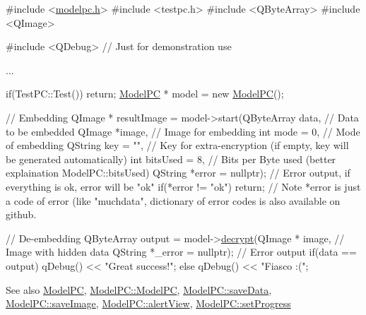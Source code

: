 \begin{DoxyCode}
\textcolor{preprocessor}{#include <\hyperlink{modelpc_8h}{modelpc.h}>}
\textcolor{preprocessor}{#include <testpc.h>}
\textcolor{preprocessor}{#include <QByteArray>}
\textcolor{preprocessor}{#include <QImage>}

\textcolor{preprocessor}{#include <QDebug>} \textcolor{comment}{// Just for demonstration use}

...

if(TestPC::Test())
    \textcolor{keywordflow}{return};
\hyperlink{class_model_p_c}{ModelPC} * model = \textcolor{keyword}{new} \hyperlink{class_model_p_c}{ModelPC}();

\textcolor{comment}{// Embedding}
QImage * resultImage = model->start(QByteArray data, \textcolor{comment}{// Data to be embedded}
                                    QImage *image, \textcolor{comment}{// Image for embedding}
                                    \textcolor{keywordtype}{int} mode = 0, \textcolor{comment}{// Mode of embedding}
                                    QString key = \textcolor{stringliteral}{""}, \textcolor{comment}{// Key for extra-encryption (if empty, key will be
       generated automatically)}
                                    \textcolor{keywordtype}{int} bitsUsed = 8, \textcolor{comment}{// Bits per Byte used (better explaination
       ModelPC::bitsUsed)}
                                    QString *error = \textcolor{keyword}{nullptr}); \textcolor{comment}{// Error output, if everything is ok, error
       will be "ok"}
\textcolor{keywordflow}{if}(*error != \textcolor{stringliteral}{"ok"})
    \textcolor{keywordflow}{return};
\textcolor{comment}{// Note *error is just a code of error (like "muchdata", dictionary of error codes is also available on
       github.}

\textcolor{comment}{// De-embedding}
QByteArray output = model->\hyperlink{class_model_p_c_a5995215a34a1e1f504035715a8013809}{decrypt}(QImage * image, \textcolor{comment}{// Image with hidden data}
                                   QString *\_error = \textcolor{keyword}{nullptr}); \textcolor{comment}{// Error output}
\textcolor{keywordflow}{if}(data == output)
   qDebug() << \textcolor{stringliteral}{"Great success!"};
\textcolor{keywordflow}{else}
   qDebug() << \textcolor{stringliteral}{"Fiasco :("};
\end{DoxyCode}
 \begin{DoxySeeAlso}{See also}
\hyperlink{class_model_p_c}{Model\+PC}, \hyperlink{class_model_p_c_ae12ebe65ec973c02a0de4850a7c1e31c}{Model\+P\+C\+::\+Model\+PC}, \hyperlink{class_model_p_c_a0855107fb0ccc247cd9e893fae9bb08a}{Model\+P\+C\+::save\+Data}, \hyperlink{class_model_p_c_a41f5e2e8022679046e4d3fa1109025fa}{Model\+P\+C\+::save\+Image}, \hyperlink{class_model_p_c_af0217a7ca5671e26090dc50a5dccdaf5}{Model\+P\+C\+::alert\+View}, \hyperlink{class_model_p_c_afdcd80f0ed5062e145a71f09b0897547}{Model\+P\+C\+::set\+Progress}
\end{DoxySeeAlso}
